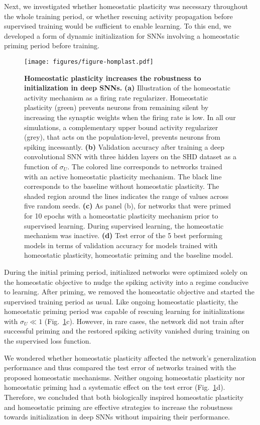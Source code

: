 \documentclass[11pt,a4paper]{article}
\begin{document}
Next, we investigated whether homeostatic plasticity was necessary throughout the whole training period, or whether rescuing activity propagation before supervised training would be sufficient to enable learning. 
To this end, we developed a form of dynamic initialization for \acp{SNN} involving a homeostatic priming period before training. 
\begin{figure}[tb]
    \centering
    \texttt{[image: figures/figure-homplast.pdf]}
    \caption{\textbf{Homeostatic plasticity increases the robustness to initialization in deep \acp{SNN}.} 
    \textbf{(a)} Illustration of the homeostatic activity mechanism as a firing rate regularizer. Homeostatic plasticity (green) prevents neurons from remaining silent by increasing the synaptic weights when the firing rate is low. In all our simulations, a complementary upper bound activity regularizer (grey), that acts on the population-level, prevents neurons from spiking incessantly. 
    \textbf{(b)} Validation accuracy after training a deep convolutional \ac{SNN} with three hidden layers on the \ac{SHD} dataset as a function of $\sigma_U$. The colored line corresponds to networks trained with an active homeostatic plasticity mechanism. The black line corresponds to the baseline  without homeostatic plasticity. The shaded region around the lines indicates the range of values across five random seeds. 
    \textbf{(c)} As panel (b), for networks that were primed for 10 epochs with a homeostatic plasticity mechanism prior to supervised learning. During supervised learning, the homeostatic mechanism was inactive.
    \textbf{(d)} Test error of the 5 best performing models in terms of validation accuracy for models trained with homeostatic plasticity, homeostatic priming and the baseline model. 
    }
    \label{fig:homplast}
\end{figure}
During the initial priming period, initialized networks were optimized solely on the homeostatic objective to nudge the spiking activity into a regime conducive to learning. 
After priming, we removed the homeostatic objective and started the supervised training period as usual.
Like ongoing homeostatic plasticity, the homeostatic priming period was capable
of rescuing learning for initializations with $\sigma_U \ll 1$ (Fig.~\ref{fig:homplast}c).
However, in rare cases, the network did not train after successful priming and the restored spiking activity vanished during training on the supervised loss function.

We wondered whether homeostatic plasticity affected the network's generalization performance and thus compared the test error of networks trained with the proposed homeostatic mechanisms.
Neither ongoing homeostatic plasticity nor homeostatic priming had a systematic effect on the test error (Fig.~\ref{fig:homplast}d). 
Therefore, we concluded that both biologically inspired homeostatic plasticity and homeostatic priming are effective strategies to increase the robustness towards initialization in deep \acp{SNN} without impairing their performance.
\end{document}
